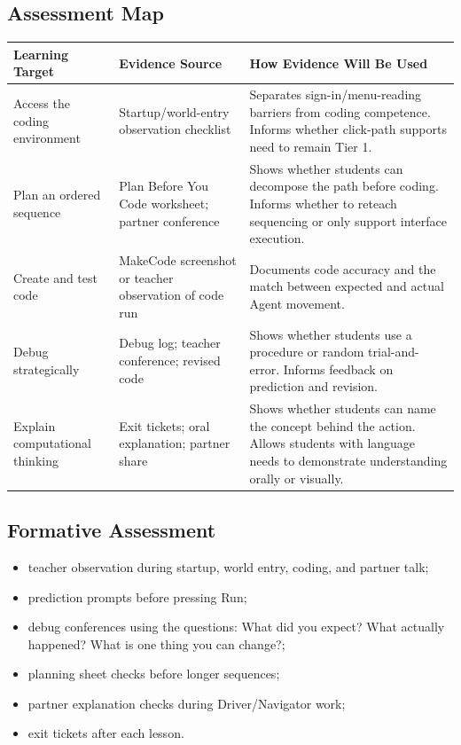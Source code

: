 \documentclass[12pt]{article}
\newcommand{\arow}{\rowcolor{altRow}}
\begin{document}
\subsection{Assessment Map}
\begin{tabularx}{\textwidth}{|P{1.4in}|P{2.0in}|L|}
\hline
{}\color{white}\bfseries Learning Target & \color{white}\bfseries Evidence Source & \color{white}\bfseries How Evidence Will Be Used \\
\hline
Access the coding environment & Startup/world-entry observation checklist & Separates sign-in/menu-reading barriers from coding competence. Informs whether click-path supports need to remain Tier 1. \\
\hline
\arow Plan an ordered sequence & Plan Before You Code worksheet; partner conference & Shows whether students can decompose the path before coding. Informs whether to reteach sequencing or only support interface execution. \\
\hline
Create and test code & MakeCode screenshot or teacher observation of code run & Documents code accuracy and the match between expected and actual Agent movement. \\
\hline
\arow Debug strategically & Debug log; teacher conference; revised code & Shows whether students use a procedure or random trial-and-error. Informs feedback on prediction and revision. \\
\hline
Explain computational thinking & Exit tickets; oral explanation; partner share & Shows whether students can name the concept behind the action. Allows students with language needs to demonstrate understanding orally or visually. \\
\hline
\end{tabularx}

\subsection{Formative Assessment}
\begin{itemize}
\item teacher observation during startup, world entry, coding, and partner talk;
\item prediction prompts before pressing Run;
\item debug conferences using the questions: What did you expect? What actually happened? What is one thing you can change?;
\item planning sheet checks before longer sequences;
\item partner explanation checks during Driver/Navigator work;
\item exit tickets after each lesson.
\end{itemize}
\end{document}
